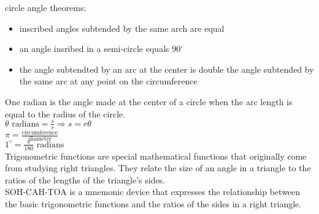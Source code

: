 \documentclass{article}
\begin{document}
circle angle theorems:
	\begin{itemize}
		\item inscribed angles subtended by the same arch are equal
		\item an angle insribed in a semi-circle equals $90^{\circ}$
		\item the angle subtendted by an arc at the center is double the angle subtended by the same arc at any point on the circumference
	\end{itemize}


\begin{center}
\end{center}

One radian is the angle made at the center of a circle when the arc length is equal to the radius of the circle.\\

$\theta \text{ radians} = \frac{s}{r} \Rightarrow s = r\theta$\\

$\pi = \frac{\text{circumference}}{\text{diameter}}$\\

$1^\circ = \frac{\pi}{180} \text{ radians}$\\

Trigonometric functions are special mathematical functions that originally come from studying right triangles. They relate the size of an angle in a triangle to the ratios of the lengths of the triangle's sides.\\

SOH-CAH-TOA is a mnemonic device that expresses the relationship between the basic trigonometric functions and the ratios of the sides in a right triangle.\\
\end{document}
